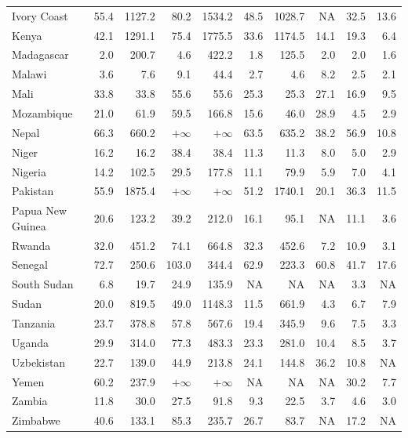 \documentclass[12pt,english]{article}
\begin{document}
\begin{table}[b]
{\begin{tabular}[t]{lrrrrrrrrr}
      Ivory Coast & 55.4 & 1127.2 & 80.2 & 1534.2 & 48.5 & 1028.7 & NA & 32.5 & 13.6\\
      Kenya & 42.1 & 1291.1 & 75.4 & 1775.5 & 33.6 & 1174.5 & 14.1 & 19.3 & 6.4\\
      Madagascar & 2.0 & 200.7 & 4.6 & 422.2 & 1.8 & 125.5 & 2.0 & 2.0 & 1.6\\
      Malawi & 3.6 & 7.6 & 9.1 & 44.4 & 2.7 & 4.6 & 8.2 & 2.5 & 2.1\\
      Mali & 33.8 & 33.8 & 55.6 & 55.6 & 25.3 & 25.3 & 27.1 & 16.9 & 9.5\\
      Mozambique & 21.0 & 61.9 & 59.5 & 166.8 & 15.6 & 46.0 & 28.9 & 4.5 & 2.9\\
      Nepal & 66.3 & 660.2 & $+\infty$ & $+\infty$ & 63.5 & 635.2 & 38.2 & 56.9 & 10.8\\
      Niger & 16.2 & 16.2 & 38.4 & 38.4 & 11.3 & 11.3 & 8.0 & 5.0 & 2.9\\
      Nigeria & 14.2 & 102.5 & 29.5 & 177.8 & 11.1 & 79.9 & 5.9 & 7.0 & 4.1\\
      Pakistan & 55.9 & 1875.4 & $+\infty$ & $+\infty$ & 51.2 & 1740.1 & 20.1 & 36.3 & 11.5\\
      Papua New Guinea & 20.6 & 123.2 & 39.2 & 212.0 & 16.1 & 95.1 & NA & 11.1 & 3.6\\
      Rwanda & 32.0 & 451.2 & 74.1 & 664.8 & 32.3 & 452.6 & 7.2 & 10.9 & 3.1\\
      Senegal & 72.7 & 250.6 & 103.0 & 344.4 & 62.9 & 223.3 & 60.8 & 41.7 & 17.6\\
      South Sudan & 6.8 & 19.7 & 24.9 & 135.9 & NA & NA & NA & 3.3 & NA\\
      Sudan & 20.0 & 819.5 & 49.0 & 1148.3 & 11.5 & 661.9 & 4.3 & 6.7 & 7.9\\
      Tanzania & 23.7 & 378.8 & 57.8 & 567.6 & 19.4 & 345.9 & 9.6 & 7.5 & 3.3\\
      Uganda & 29.9 & 314.0 & 77.3 & 483.3 & 23.3 & 281.0 & 10.4 & 8.5 & 3.7\\
      Uzbekistan & 22.7 & 139.0 & 44.9 & 213.8 & 24.1 & 144.8 & 36.2 & 10.8 & NA\\
      Yemen & 60.2 & 237.9 & $+\infty$ & $+\infty$ & NA & NA & NA & 30.2 & 7.7\\
      Zambia & 11.8 & 30.0 & 27.5 & 91.8 & 9.3 & 22.5 & 3.7 & 4.6 & 3.0\\
      Zimbabwe & 40.6 & 133.1 & 85.3 & 235.7 & 26.7 & 83.7 & NA & 17.2 & NA\\
      \bottomrule
      \end{tabular}}
      \end{table}
\end{document}
